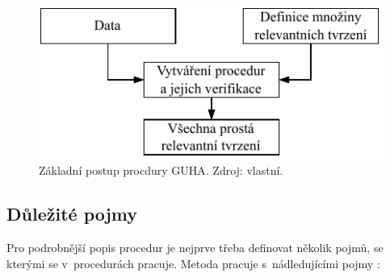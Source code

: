 \begin{figure}[hbtp!]
    \centering
    \captionsetup{justification=centering}
    \includegraphics[width=.5\textwidth]{obrazky/GUHA/GUHA2.pdf}
    \caption{Základní postup procdury GUHA. Zdroj: vlastní.}
    \label{obr:met:GUHA2}
\end{figure}

\subsection{Důležité pojmy}



Pro podrobnější popis procedur je nejprve třeba definovat několik pojmů, se kterými se v~procedurách pracuje. Metoda pracuje s~nádledujícími pojmy \cite{bib:GUHA}:

